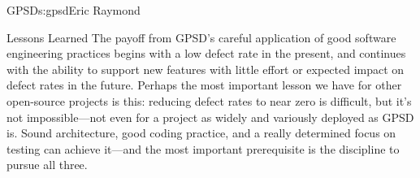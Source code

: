 \begin{aosachapter}{GPSD}{s:gpsd}{Eric Raymond}
\begin{aosasect1}{Lessons Learned}
The payoff from GPSD's careful application of good software
engineering practices begins with a low defect rate in the present,
and continues with the ability to support new features with little
effort or expected impact on defect rates in the future.  Perhaps the
most important lesson we have for other open-source projects is this:
reducing defect rates to near zero is difficult, but it's not
impossible---not even for a project as widely and variously deployed
as GPSD is.  Sound architecture, good coding practice, and a really
determined focus on testing can achieve it---and the most important
prerequisite is the discipline to pursue all three.

\end{aosasect1}

\end{aosachapter}
